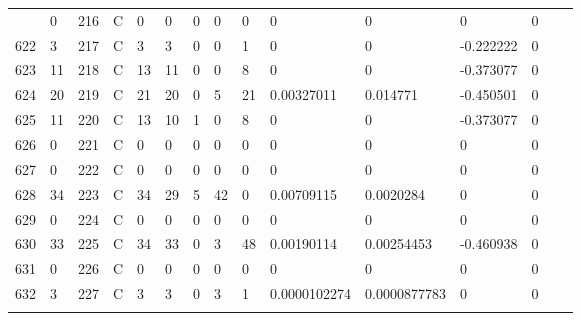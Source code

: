 \begin{longtable}{lllllllllllllll}
\begin{comment}
	621 & 0                 & 216 & C   & 0                 & 0                 & 0                 & 0    & 0          & 0              & 0              & 0             & 0            \\
	622 & 3                 & 217 & C   & 3                 & 3                 & 0                 & 0    & 1          & 0              & 0              & -0.222222     & 0            \\
	623 & 11                & 218 & C   & 13                & 11                & 0                 & 0    & 8          & 0              & 0              & -0.373077     & 0            \\
	624 & 20                & 219 & C   & 21                & 20                & 0                 & 5    & 21         & 0.00327011     & 0.014771       & -0.450501     & 0            \\
	625 & 11                & 220 & C   & 13                & 10                & 1                 & 0    & 8          & 0              & 0              & -0.373077     & 0            \\
	626 & 0                 & 221 & C   & 0                 & 0                 & 0                 & 0    & 0          & 0              & 0              & 0             & 0            \\
	627 & 0                 & 222 & C   & 0                 & 0                 & 0                 & 0    & 0          & 0              & 0              & 0             & 0            \\
	628 & 34                & 223 & C   & 34                & 29                & 5                 & 42   & 0          & 0.00709115     & 0.0020284      & 0             & 0            \\
	629 & 0                 & 224 & C   & 0                 & 0                 & 0                 & 0    & 0          & 0              & 0              & 0             & 0            \\
	630 & 33                & 225 & C   & 34                & 33                & 0                 & 3    & 48         & 0.00190114     & 0.00254453     & -0.460938     & 0            \\
	631 & 0                 & 226 & C   & 0                 & 0                 & 0                 & 0    & 0          & 0              & 0              & 0             & 0            \\
	632 & 3                 & 227 & C   & 3                 & 3                 & 0                 & 3    & 1          & 0.0000102274   & 0.0000877783   & 0             & 0            \\

\end{comment}
\end{longtable}
